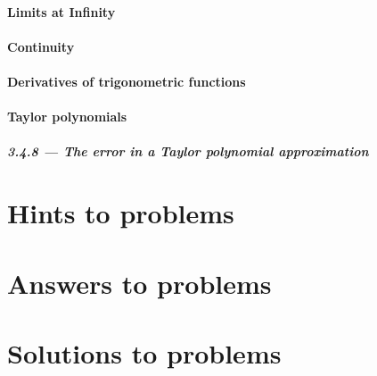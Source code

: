 \documentclass[12pt,letterpaper]{book}
\begin{document}
\subsection{Limits at Infinity}

\subsection{Continuity}


\setcounter{section}{2}\setcounter{subsection}{7}
\subsection{Derivatives of trigonometric functions}


\setcounter{section}{3}\setcounter{subsection}{3}
\subsection{Taylor polynomials}
\subsubsection{3.4.8 --- The error in a Taylor polynomial approximation}




\newpage
\part{Hints to problems}


\newpage
\part{Answers to problems}


\newpage
\part{Solutions to problems}

\end{document}
